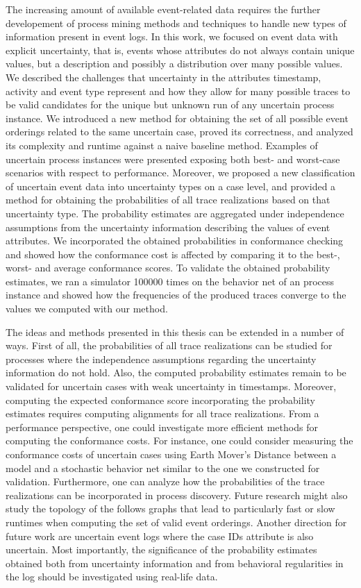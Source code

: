 The increasing amount of available event-related data requires the further developement of process mining methods and techniques to handle new types of information present in event logs.
In this work, we focused on event data with explicit uncertainty, that is, events whose attributes do not always contain unique values, but a description and possibly a distribution over many possible values.
We described the challenges that uncertainty in the attributes timestamp, activity and event type represent and how they allow for many possible traces to be valid candidates for the unique but unknown run of any uncertain process instance.
We introduced a new method for obtaining the set of all possible event orderings related to the same uncertain case, proved its correctness, and analyzed its complexity and runtime against a naive baseline method.
Examples of uncertain process instances were presented exposing both best- and worst-case scenarios with respect to performance.
Moreover, we proposed a new classification of uncertain event data into uncertainty types on a case level, and provided a method for obtaining the probabilities of all trace realizations based on that uncertainty type.
The probability estimates are aggregated under independence assumptions from the uncertainty information describing the values of event attributes.
We incorporated the obtained probabilities in conformance checking and showed how the conformance cost is affected by comparing it to the best-, worst- and average conformance scores.
To validate the obtained probability estimates, we ran a simulator 100000 times on the behavior net of an process instance and showed how the frequencies of the produced traces converge to the values we computed with our method.

The ideas and methods presented in this thesis can be extended in a number of ways.
First of all, the probabilities of all trace realizations can be studied for processes where the independence assumptions regarding the uncertainty information do not hold.
Also, the computed probability estimates remain to be validated for uncertain cases with weak uncertainty in timestamps.
Moreover, computing the expected conformance score incorporating the probability estimates requires computing alignments for all trace realizations.
From a performance perspective, one could investigate more efficient methods for computing the conformance costs.
For instance, one could consider measuring the conformance costs of uncertain cases using Earth Mover's Distance between a model and a stochastic behavior net similar to the one we constructed for validation.
Furthermore, one can analyze how the probabilities of the trace realizations can be incorporated in process discovery.
Future research might also study the topology of the follows graphs that lead to particularly fast or slow runtimes when computing the set of valid event orderings.
Another direction for future work are uncertain event logs where the case IDs attribute is also uncertain.
Most importantly, the significance of the probability estimates obtained both from uncertainty information and from behavioral regularities in the log should be investigated using real-life data.
